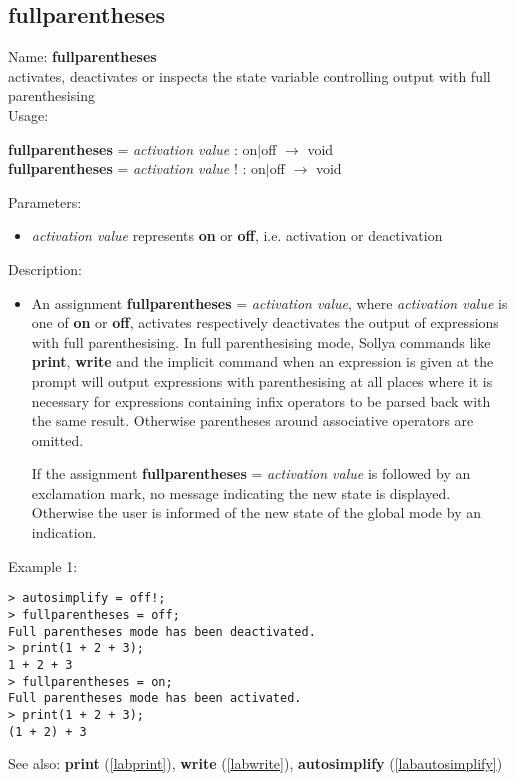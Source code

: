\subsection{fullparentheses}
\label{labfullparentheses}
\noindent Name: \textbf{fullparentheses}\\
activates, deactivates or inspects the state variable controlling output with full parenthesising\\

\noindent Usage: 
\begin{center}
\textbf{fullparentheses} = \emph{activation value} : \textsf{on$|$off} $\rightarrow$ \textsf{void}\\
\textbf{fullparentheses} = \emph{activation value} ! : \textsf{on$|$off} $\rightarrow$ \textsf{void}\\
\end{center}
Parameters: 
\begin{itemize}
\item \emph{activation value} represents \textbf{on} or \textbf{off}, i.e. activation or deactivation
\end{itemize}
\noindent Description: \begin{itemize}

\item An assignment \textbf{fullparentheses} = \emph{activation value}, where \emph{activation value}
   is one of \textbf{on} or \textbf{off}, activates respectively deactivates the output
   of expressions with full parenthesising. In full parenthesising mode,
   Sollya commands like \textbf{print}, \textbf{write} and the implicit command when an
   expression is given at the prompt will output expressions with
   parenthesising at all places where it is necessary for expressions
   containing infix operators to be parsed back with the same
   result. Otherwise parentheses around associative operators are
   omitted.
    
   If the assignment \textbf{fullparentheses} = \emph{activation value} is followed by an
   exclamation mark, no message indicating the new state is
   displayed. Otherwise the user is informed of the new state of the
   global mode by an indication.
\end{itemize}
\noindent Example 1: 
\begin{center}\begin{minipage}{15cm}\begin{Verbatim}[frame=single]
> autosimplify = off!;
> fullparentheses = off;
Full parentheses mode has been deactivated.
> print(1 + 2 + 3);
1 + 2 + 3
> fullparentheses = on;
Full parentheses mode has been activated.
> print(1 + 2 + 3);
(1 + 2) + 3
\end{Verbatim}
\end{minipage}\end{center}
See also: \textbf{print} (\ref{labprint}), \textbf{write} (\ref{labwrite}), \textbf{autosimplify} (\ref{labautosimplify})
